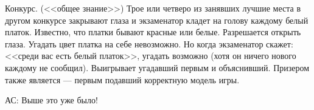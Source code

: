 \begin{problem}
 Конкурс. (<<общее знание>>) Трое или четверо из
занявших лучшие места в другом конкурсе закрывают
глаза и экзаменатор кладет на голову каждому белый
платок. Известно, что платки бывают красные или
белые. Разрешается открыть глаза. Угадать цвет
платка на себе невозможно. Но когда экзаменатор
скажет: <<среди вас есть белый платок>>, угадать
возможно (хотя он ничего нового каждому не
сообщил). Выигрывает угадавший первым и объяснивший.
Призером также является --- первым подавший
корректную модель игры.


{\red АС:  Выше это уже было!}


\begin{sol}

\end{sol}
\end{problem}
